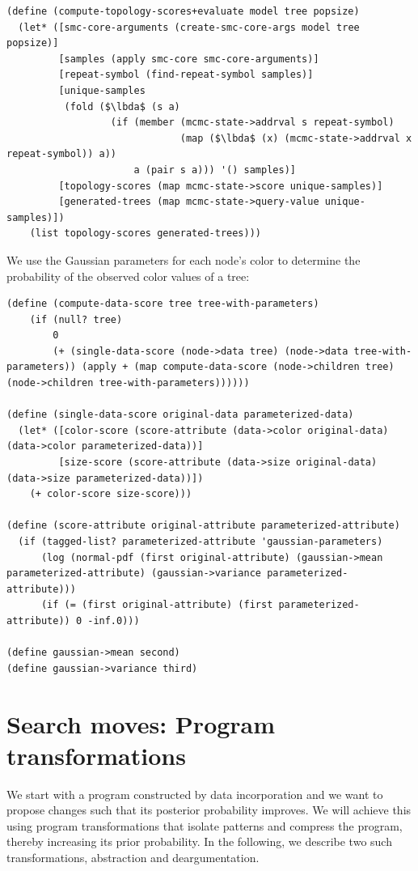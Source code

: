 \documentclass[a4paper,10pt]{article}
\newcommand{\lbda}{\color[rgb]{0,.3,.7} \lambda}
\begin{document}
\begin{lstlisting}[frame=trbl]
(define (compute-topology-scores+evaluate model tree popsize)
  (let* ([smc-core-arguments (create-smc-core-args model tree popsize)]
         [samples (apply smc-core smc-core-arguments)]
         [repeat-symbol (find-repeat-symbol samples)]
         [unique-samples
          (fold ($\lbda$ (s a)
                  (if (member (mcmc-state->addrval s repeat-symbol)
                              (map ($\lbda$ (x) (mcmc-state->addrval x repeat-symbol)) a))
                      a (pair s a))) '() samples)]
         [topology-scores (map mcmc-state->score unique-samples)]
         [generated-trees (map mcmc-state->query-value unique-samples)])
    (list topology-scores generated-trees)))
\end{lstlisting}
We use the Gaussian parameters for each node's color to determine the probability of the observed color values of a tree:
\begin{lstlisting}[frame=trbl]
(define (compute-data-score tree tree-with-parameters)
    (if (null? tree)
        0
        (+ (single-data-score (node->data tree) (node->data tree-with-parameters)) (apply + (map compute-data-score (node->children tree) (node->children tree-with-parameters))))))

(define (single-data-score original-data parameterized-data)
  (let* ([color-score (score-attribute (data->color original-data) (data->color parameterized-data))]
         [size-score (score-attribute (data->size original-data) (data->size parameterized-data))])
    (+ color-score size-score)))

(define (score-attribute original-attribute parameterized-attribute)
  (if (tagged-list? parameterized-attribute 'gaussian-parameters)
      (log (normal-pdf (first original-attribute) (gaussian->mean parameterized-attribute) (gaussian->variance parameterized-attribute)))
      (if (= (first original-attribute) (first parameterized-attribute)) 0 -inf.0)))

(define gaussian->mean second)
(define gaussian->variance third)
\end{lstlisting}


\newpage
\section{Search moves: Program transformations}

We start with a program constructed by data incorporation and we want to propose changes such that its posterior probability improves. We will achieve this  using program transformations that isolate patterns and compress the program, thereby increasing its prior probability. In the following, we describe two such transformations, abstraction and deargumentation.
\end{document}
